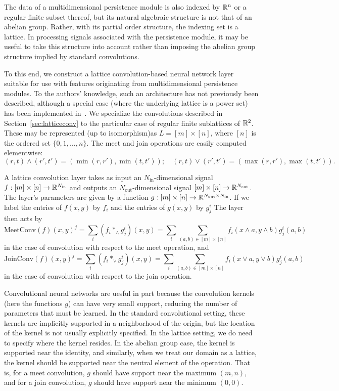 \documentclass{article}
\begin{document}
The data of a multidimensional persistence module is also indexed by $\mathbb{R}^n$ or a
regular finite subset thereof, but its natural algebraic structure is not that
of an abelian group. Rather, with its partial order structure, the indexing set
is a lattice. In processing signals associated with the persistence module, it
may be useful to take this structure into account rather than imposing the
abelian group structure implied by standard convolutions.

To this end, we construct a lattice convolution-based neural network layer
suitable for use with features originating from multidimensional persistence
modules. To the authors' knowledge, such an architecture has not previously been
described, although a special case (where the underlying lattice is a power set)
has been implemented in~\cite{wendler_powerset_2019}. We specialize the convolutions described in
Section~\ref{sec:latticeconv} to the particular case of regular finite
sublattices of $\mathbb{R}^2$. These may be represented (up to isomorphism)as $L = [m]
\times [n]$, where $[n]$ is the ordered set $\{0,1,\dots,n\}$. The meet and join operations are easily computed
elementwise:
\[(r,t) \wedge (r',t') = (\min(r,r'),\min(t,t'));\quad (r,t)\vee (r',t') =
  (\max(r,r'),\max(t,t')).\]

A lattice convolution layer takes as input an $N_{\text{in}}$-dimensional signal
$f : [m] \times [n] \to \mathbb{R}^{N_{\text{in}}}$ and outputs an
$N_{\text{out}}$-dimensional signal $ [m] \times [n] \to
\mathbb{R}^{N_{\text{out}}}$. The layer's parameters are given by a function $g: [m]
\times [n] \to \mathbb{R}^{N_{\text{out}}\times N_{\text{in}}}$. If we label the
entries of $f(x,y)$ by $f_i$ and the entries of $g(x,y)$ by $g^i_j$ The layer then acts by
\[\text{MeetConv}(f)(x,y)^j = \sum_{i} (f_i \ast_{\wedge} g^i_j)(x,y) = \sum_i
  \sum_{(a,b) \in [m]\times [n]} f_i(x \wedge a, y \wedge b)g^i_j(a,b)\]
in the case of convolution with respect to the meet operation, and
\[\text{JoinConv}(f)(x,y)^j = \sum_{i} (f_i \ast_{\vee} g^i_j)(x,y) = \sum_i
  \sum_{(a,b) \in [m]\times [n]} f_i(x \vee a, y \vee b)g^i_j(a,b)\]
in the case of convolution with respect to the join operation.

Convolutional neural networks are uesful in part because the convolution kernels
(here the functions $g$) can have very small support, reducing the number of
parameters that must be learned. In the standard convolutional setting, these
kernels are implicitly supported in a neighborhood of the origin, but the
location of the kernel is not usually explicitly specified. In the lattice
setting, we do need to specify where the kernel resides. In the abelian group
case, the kernel is supported near the identity, and similarly, 
when we treat our domain as a lattice, the kernel should be supported
near the neutral element of the operation. That is, for a meet convolution, $g$
should have support near the maximum $(m,n)$, and for a join convolution, $g$
should have support near the minimum $(0,0)$.
\end{document}
